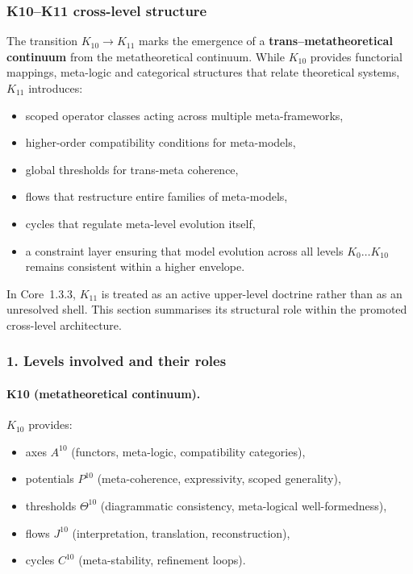 
\subsubsection{K10–K11 cross-level structure}
\label{sec:crossk-k10-k11}

The transition $K_{10} \rightarrow K_{11}$ marks the emergence of a
\textbf{trans–metatheoretical continuum} from the metatheoretical
continuum. While $K_{10}$ provides functorial mappings, meta-logic and
categorical structures that relate theoretical systems, $K_{11}$ introduces:
\begin{itemize}
  \item scoped operator classes acting across multiple meta-frameworks,
  \item higher-order compatibility conditions for meta-models,
  \item global thresholds for trans-meta coherence,
  \item flows that restructure entire families of meta-models,
  \item cycles that regulate meta-level evolution itself,
  \item a constraint layer ensuring that model evolution across all levels
        $K_0\dots K_{10}$ remains consistent within a higher envelope.
\end{itemize}

In Core~1.3.3, $K_{11}$ is treated as an active upper-level doctrine rather than
as an unresolved shell. This section summarises its structural role
within the promoted cross-level architecture.

\subsubsection{1. Levels involved and their roles}

\paragraph{K10 (metatheoretical continuum).}
$K_{10}$ provides:
\begin{itemize}
  \item axes $A^{10}$ (functors, meta-logic, compatibility categories),
  \item potentials $P^{10}$ (meta-coherence, expressivity, scoped generality),
  \item thresholds $\Theta^{10}$ (diagrammatic consistency,
        meta-logical well-formedness),
  \item flows $J^{10}$ (interpretation, translation, reconstruction),
  \item cycles $C^{10}$ (meta-stability, refinement loops).
\end{itemize}

